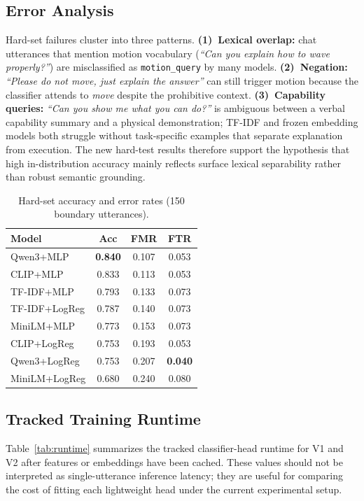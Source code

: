 \documentclass{article}
\begin{document}
\subsection{Error Analysis}
Hard-set failures cluster into three patterns.
\textbf{(1)~Lexical overlap:} chat utterances that mention motion vocabulary
(\emph{``Can you explain how to wave properly?''}) are misclassified as
\texttt{motion\_query} by many models.
\textbf{(2)~Negation:} \emph{``Please do not move, just explain the answer''}
can still trigger motion because the classifier attends to \emph{move} despite
the prohibitive context.
\textbf{(3)~Capability queries:} \emph{``Can you show me what you can do?''}
is ambiguous between a verbal capability summary and a physical demonstration;
TF-IDF and frozen embedding models both struggle without task-specific examples
that separate explanation from execution.
The new hard-test results therefore support the hypothesis that high
in-distribution accuracy mainly reflects surface lexical separability rather
than robust semantic grounding.

\begin{table}[h]
  \centering
  \caption{Hard-set accuracy and error rates (150 boundary utterances).}
  \label{tab:hard}
  \small
  \begin{tabular}{lccc}
    \toprule
    Model & Acc & FMR & FTR \\
    \midrule
    Qwen3+MLP        & \textbf{0.840} & 0.107 & 0.053 \\
    CLIP+MLP         & 0.833 & 0.113 & 0.053 \\
    TF-IDF+MLP       & 0.793 & 0.133 & 0.073 \\
    TF-IDF+LogReg    & 0.787 & 0.140 & 0.073 \\
    MiniLM+MLP       & 0.773 & 0.153 & 0.073 \\
    CLIP+LogReg      & 0.753 & 0.193 & 0.053 \\
    Qwen3+LogReg     & 0.753 & 0.207 & \textbf{0.040} \\
    MiniLM+LogReg    & 0.680 & 0.240 & 0.080 \\
    \bottomrule
  \end{tabular}
\end{table}

\subsection{Tracked Training Runtime}

Table~\ref{tab:runtime} summarizes the tracked classifier-head runtime for V1
and V2 after features or embeddings have been cached.
These values should not be interpreted as single-utterance inference latency;
they are useful for comparing the cost of fitting each lightweight head under
the current experimental setup.
\end{document}
